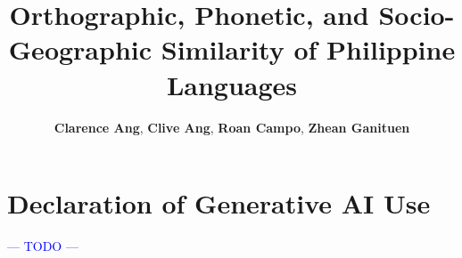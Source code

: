 \documentclass[11pt]{article}
\title{Orthographic, Phonetic, and Socio-Geographic Similarity of Philippine Languages}
\author{
  \textbf{Clarence Ang},
  \textbf{Clive Ang},
  \textbf{Roan Campo},
  \textbf{Zhean Ganituen}
}
\newcommand{\todo}{\textcolor{blue}{--- TODO ---}}
\begin{document}
\maketitle










\section*{Declaration of Generative AI Use} \todo



\appendix
{}

\end{document}
